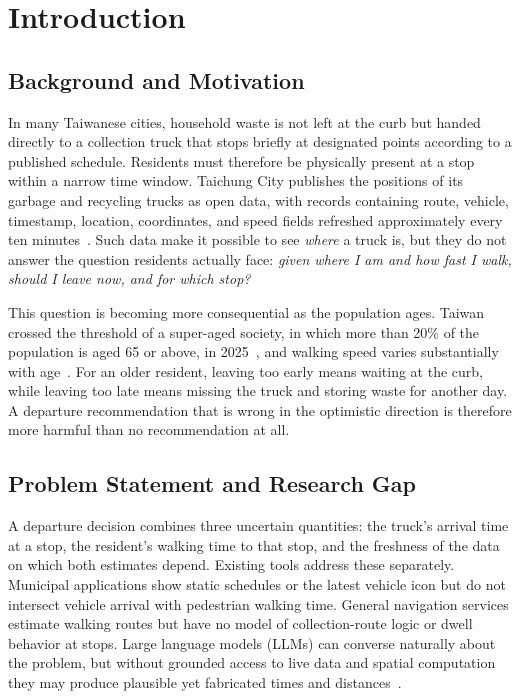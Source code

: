 \section{Introduction}\label{sec:intro}

\subsection{Background and Motivation}
In many Taiwanese cities, household waste is not left at the curb but handed directly to a collection truck that stops briefly at designated points according to a published schedule. Residents must therefore be physically present at a stop within a narrow time window. Taichung City publishes the positions of its garbage and recycling trucks as open data, with records containing route, vehicle, timestamp, location, coordinates, and speed fields refreshed approximately every ten minutes~\cite{taichung_fleet_api}. Such data make it possible to see \emph{where} a truck is, but they do not answer the question residents actually face: \emph{given where I am and how fast I walk, should I leave now, and for which stop?}

This question is becoming more consequential as the population ages. Taiwan crossed the threshold of a super-aged society, in which more than 20\% of the population is aged 65 or above, in 2025~\cite{ndc_population}, and walking speed varies substantially with age~\cite{knoblauch1996}. For an older resident, leaving too early means waiting at the curb, while leaving too late means missing the truck and storing waste for another day. A departure recommendation that is wrong in the optimistic direction is therefore more harmful than no recommendation at all.

\subsection{Problem Statement and Research Gap}
A departure decision combines three uncertain quantities: the truck's arrival time at a stop, the resident's walking time to that stop, and the freshness of the data on which both estimates depend. Existing tools address these separately. Municipal applications show static schedules or the latest vehicle icon but do not intersect vehicle arrival with pedestrian walking time. General navigation services estimate walking routes but have no model of collection-route logic or dwell behavior at stops. Large language models (LLMs) can converse naturally about the problem, but without grounded access to live data and spatial computation they may produce plausible yet fabricated times and distances~\cite{ji2023hallucination}.

